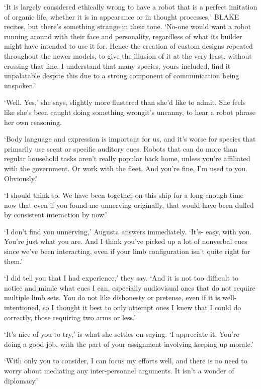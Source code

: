 `It is largely considered ethically wrong to have a robot that is a
perfect imitation of organic life, whether it is in appearance or in
thought processes,' BLAKE recites, but there's something strange in
their tone. `No-one would want a robot running around with their face
and personality, regardless of what its builder might have intended to
use it for. Hence the creation of custom designs repeated throughout
the newer models, to give the illusion of it at the very least,
without crossing that line. I understand that many species, yours
included, find it unpalatable despite this due to a strong component
of communication being unspoken.'

`Well. Yes,' she says, slightly more flustered than she'd like to
admit. She feels like she's been caught doing something
wrong\textemdash it's uncanny, to hear a robot phrase her own
reasoning.

`Body language and expression is important for us, and it's worse for
species that primarily use scent or specific auditory cues. Robots
that can do more than regular household tasks aren't really popular
back home, unless you're affiliated with the government. Or work with
the fleet. And you're fine, I'm used to you. Obviously.'

`I should think so. We have been together on this ship for a long
enough time now that even if you found me unnerving originally, that
would have been dulled by consistent interaction by now.'

`I don't find you unnerving,' Augusta answers immediately. `It's-
easy, with you. You're just \textellipsis what you are. And I think
you've picked up a lot of nonverbal cues since we've been interacting,
even if your limb configuration isn't quite right for them.'

`I did tell you that I had experience,' they say. `And it is not too
difficult to notice and mimic what cues I can, especially audiovisual
ones that do not require multiple limb sets. You do not like
dishonesty or pretense, even if it is well-intentioned, so I thought
it best to only attempt ones I knew that I could do correctly, those
requiring two arms or less.'

`It's \textellipsis nice of you to try,' is what she settles on
saying. `I appreciate it. You're doing a good job, with the part of
your assignment involving keeping up morale.'

`With only you to consider, I can focus my efforts well, and there is
no need to worry about mediating any inter-personnel arguments. It
isn't a wonder of diplomacy.'

